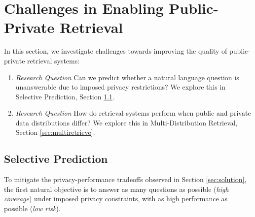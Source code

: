 \documentclass{article}
\begin{document}
 

\section{Challenges in Enabling Public-Private Retrieval}
\label{sec:section6}

In this section, we investigate challenges towards improving the quality of public-private retrieval systems: 
\begin{enumerate}
    \item \textit{Research Question} Can we predict whether a natural language question is unanswerable due to imposed privacy restrictions? We explore this in Selective Prediction, Section \ref{sec:selpred}.
    \item \textit{Research Question} How do retrieval systems perform when public and private data distributions differ? We explore this in Multi-Distribution Retrieval, Section \ref{sec:multiretrieve}.
\end{enumerate} 



\subsection{Selective Prediction}
\label{sec:selpred}
To mitigate the privacy-performance tradeoffs observed in Section \ref{sec:solution}, the first natural objective is to answer as many questions as possible (\textit{high coverage}) under imposed privacy constraints, with as high performance as possible (\textit{low risk}).
\end{document}
